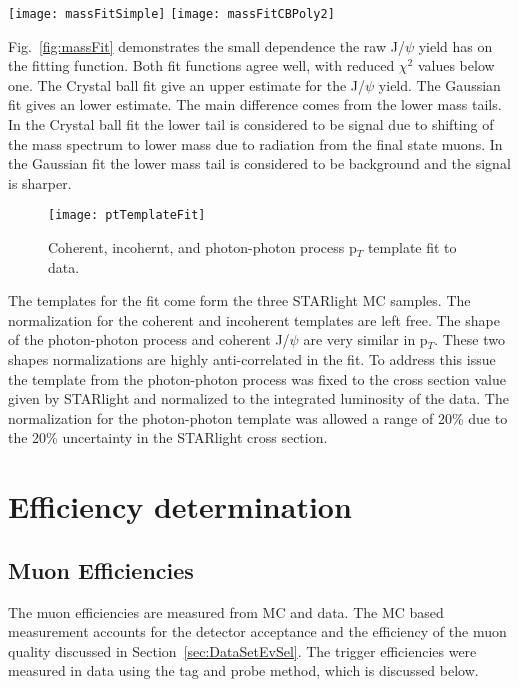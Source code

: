       \begin{figure*}[!Hhtb]
        \centering
        \texttt{[image: massFitSimple]}
        \texttt{[image: massFitCBPoly2]}
        \caption{Mass fit to J/$\psi$ using Gaussian (Left) and Crystal Ball (Right) for the 
          signal and a polynomial for the background}
        \label{fig:massFit}
      \end{figure*}

    Fig.~\ref{fig:massFit} demonstrates the small dependence the raw J/$\psi$ 
      yield has on the fitting function. 
    Both fit functions agree well, with reduced $\chi^{2}$ values below one.
    The Crystal ball fit give an upper estimate for the J/$\psi$ yield.
    The Gaussian fit gives an lower estimate. 
    The main difference comes from the lower mass tails.
    In the Crystal ball fit the lower tail is considered to be signal due to 
      shifting of the mass spectrum to lower mass due to radiation from the 
      final state muons. 
    In the Gaussian fit the lower mass tail is considered to be background and 
      the signal is sharper.

      \begin{figure}[!Hhtb]
        \centering
        \texttt{[image: ptTemplateFit]}
        \caption{Coherent, incohernt, and photon-photon process p$_{T}$ template fit to data.}
        \label{fig:ptTempFit}
      \end{figure}

      The templates for the fit come form the three STARlight MC samples. 
      The normalization for the coherent and incoherent templates are left
        free. 
      The shape of the photon-photon process and coherent J/$\psi$ are very 
        similar in p$_{T}$.
      These two shapes normalizations are highly anti-correlated in the fit.
      To address this issue the template from the photon-photon process was 
        fixed to the cross section value given by STARlight and normalized to
        the integrated luminosity of the data. 
      The normalization for the photon-photon template was allowed a range of 
        20\% due to the 20\% uncertainty in the STARlight cross section.

  \section{\label{sec:effDet} Efficiency determination}
    \subsection{Muon Efficiencies}
      The muon efficiencies are measured from MC and data.
      The MC based measurement accounts for the detector acceptance and the 
        efficiency of the muon quality discussed in 
        Section~\ref{sec:DataSetEvSel}.
      The trigger efficiencies were measured in data using the tag and probe 
        method, which is discussed below. 

